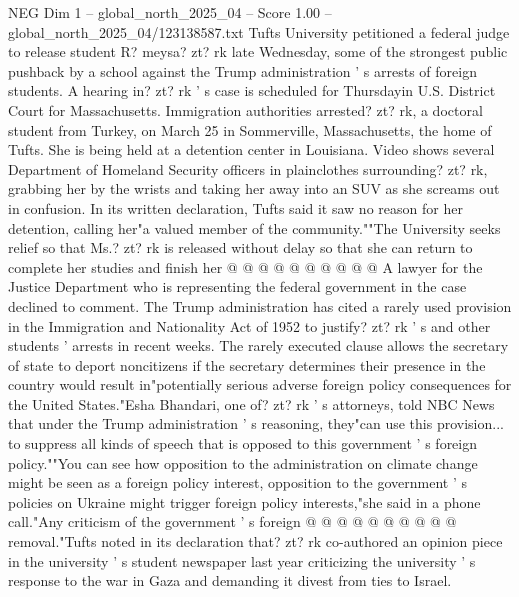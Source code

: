 \begin{textsample}{NEG Dim 1 – global\_north\_2025\_04 – Score 1.00 – global\_north\_2025\_04/123138587.txt}  \label{ex:f1_neg_045}
Tufts University petitioned a federal judge to release student R? meysa? zt? rk late Wednesday, some of the strongest public pushback by a school against the Trump administration ' s arrests of foreign students.
A hearing in? zt? rk ' s case is scheduled for Thursdayin U.S.
District Court for Massachusetts.
Immigration authorities arrested? zt? rk, a doctoral student from Turkey, on March 25 in Sommerville, Massachusetts, the home of Tufts.
She is being held at a detention center in Louisiana.
Video shows several Department of Homeland Security officers in plainclothes surrounding? zt? rk, grabbing her by the wrists and taking her away into an SUV as she screams out in confusion.
In its written declaration, Tufts said it saw no reason for her detention, calling her"a valued member of the community.""The University seeks relief so that Ms.? zt? rk is released without delay so that she can return to complete her studies and finish her @ @ @ @ @ @ @ @ @ @ A lawyer for the Justice Department who is representing the federal government in the case declined to comment.
The Trump administration has cited a rarely used provision in the Immigration and Nationality Act of 1952 to justify? zt? rk ' s and other students ' arrests in recent weeks.
The rarely executed clause allows the secretary of state to deport noncitizens if the secretary determines their presence in the country would result in"potentially serious adverse foreign policy consequences for the United States."Esha Bhandari, one of? zt? rk ' s attorneys, told NBC News that under the Trump administration ' s reasoning, they"can use this provision... to suppress all kinds of speech that is opposed to this government ' s foreign policy.""You can see how opposition to the administration on climate change might be seen as a foreign policy interest, opposition to the government ' s policies on Ukraine might trigger foreign policy interests,"she said in a phone call."Any criticism of the government ' s foreign @ @ @ @ @ @ @ @ @ @ removal."Tufts noted in its declaration that? zt? rk co-authored an opinion piece in the university ' s student newspaper last year criticizing the university ' s response to the war in Gaza and demanding it divest from ties to Israel.

\end{textsample}
